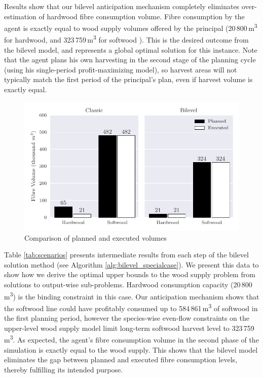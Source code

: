 Results show that our bilevel anticipation mechanism completely eliminates over-estimation of hardwood fibre consumption volume. 
Fibre consumption by the agent is exactly equal to wood supply volumes offered by the principal (20\,800\,\si{\cubic\metre} for hardwood, and 323\,759\,\si{\cubic\metre} for softwood ).
This is the desired outcome from the bilevel model, and represents a global optimal solution for this instance. Note that the agent plans his own harvesting in the second stage of the planning cycle (using his single-period profit-maximizing model), so harvest areas will not typically match the first period of the principal's plan, even if harvest volume is exactly equal.  

\begin{figure}[H]
  \centering
  \medskip
  \includegraphics[width=\textwidth]{images/article2_compbar}
  \caption{Comparison of planned and executed volumes}
  \label{fig:scenarios_detail}
\end{figure}

Table \ref{tab:scenarios} presents intermediate results from each step of the bilevel solution method (see Algorithm \ref{alg:bilevel_specialcase}).
We present this data to show how we derive the optimal upper bounds to the wood supply problem from solutions to output-wise sub-problems.
Hardwood consumption capacity (20\,800\,\si{\cubic\metre}) is the binding constraint in this case. 
Our anticipation mechanism shows that the softwood line could have profitably consumed up to 584\,861\,\si{\cubic\metre} of softwood in the first planning period, however the species-wise even-flow constraints on the upper-level wood supply model limit long-term softwood harvest level to 323\,759\,\si{\cubic\metre}.
As expected, the agent's fibre consumption volume in the second phase of the simulation is exactly equal to the wood supply.
This shows that the bilevel model eliminates the gap between planned and executed fibre consumption levels, thereby fulfilling its intended purpose.

